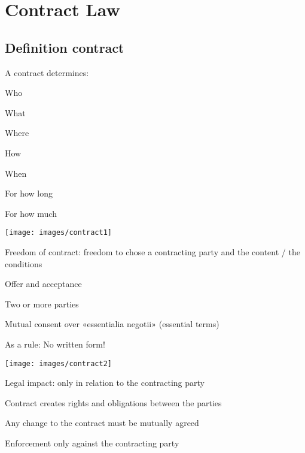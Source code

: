 \section{Contract Law}
\subsection{Definition contract}
A contract determines:
\begin{compactitem}
	\item Who
	\item What
	\item Where
	\item How
	\item When
	\item For how long
	\item For how much
\end{compactitem}
\texttt{[image: images/contract1]}
\begin{compactitem}
	\item Freedom of contract: freedom to chose a contracting party and the content / the conditions
	\item Offer and acceptance
	\item Two or more parties
	\item Mutual consent over «essentialia negotii» (essential terms)
	\item As a rule: No written form!
\end{compactitem}
\texttt{[image: images/contract2]}
\begin{compactitem}
	\item Legal impact: only in relation to the contracting party
	\item Contract creates rights and obligations between the parties
	\item Any change to the contract must be mutually agreed
	\item Enforcement only against the contracting party
\end{compactitem}